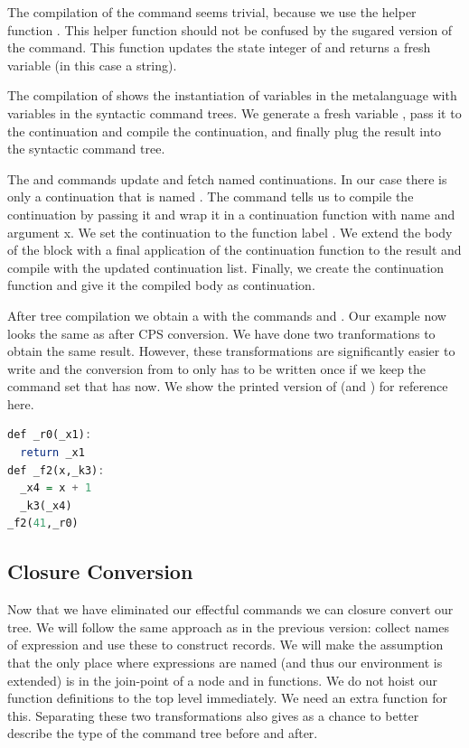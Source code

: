 The compilation of the  command seems trivial, because we use the helper function . This helper function should not be confused by the sugared version of the  command. This function updates the state integer of  and returns a fresh variable (in this case a string).

The compilation of  shows the instantiation of variables in the metalanguage with variables in the syntactic command trees. We generate a fresh variable , pass it to the continuation and compile the continuation, and finally plug the result into the syntactic command tree.

The  and  commands update and fetch named continuations. In our case there is only a continuation that is named . The  command tells us to compile the continuation  by passing it  and wrap it in a continuation function with name  and argument {x}. We set the continuation  to the function label . We extend the body of the block with a final application of the continuation function  to the result  and compile with the updated continuation list. Finally, we create the continuation function and give it the compiled body  as continuation.

After tree compilation we obtain a  with the commands  and . Our example  now looks the same as  after CPS conversion. We have done two tranformations to obtain the same result. However, these transformations are significantly easier to write and the conversion from  to  only has to be written once if we keep the command set that  has now. We show the printed version of  (and ) for reference here.

\begin{lstlisting}[language=Haskell]
def _r0(_x1):
  return _x1
def _f2(x,_k3):
  _x4 = x + 1
  _k3(_x4)
_f2(41,_r0)
\end{lstlisting}

\subsection{\label{subsection:closconvert2}Closure Conversion}
Now that we have eliminated our effectful commands we can closure convert our tree. We will follow the same approach as in the previous version: collect names of expression and use these to construct records. We will make the assumption that the only place where expressions are named (and thus our environment is extended) is in the join-point of a node and in functions. We do not hoist our function definitions to the top level immediately. We need an extra function for this. Separating these two transformations also gives as a chance to better describe the type of the command tree before and after.

